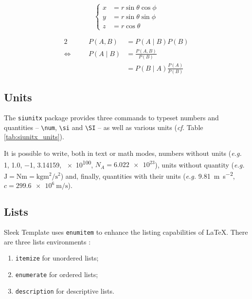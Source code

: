 \documentclass[a4paper, 12pt]{report}
\def\tbs{\textbackslash}
\begin{document}
    \begin{equation}
        \left\{
        \begin{aligned}
            x & = r \sin \theta \cos \phi \\
            y & = r \sin \theta \sin \phi \\
            z & = r \cos \theta
        \end{aligned}
        \right.
    \end{equation}

    \begin{alignat*}{2}
                              & & P(A, B)  & = P(A \mid B) P(B)                        \\
        \Leftrightarrow \quad & & P(A \mid B) & = \frac{P(A, B)}{P(B)}                 \\
                              & &          & = P(B \mid A) \frac{P(A)}{P(B)}
    \end{alignat*}

    \subsection{Units}

    The \texttt{siunitx} package provides three commands to typeset numbers and quantities -- \texttt{\tbs{}num}, \texttt{\tbs{}si} and \texttt{\tbs{}SI} -- as well as various units (\emph{cf.} Table \ref{tab:siunitx_units}).

    It is possible to write, both in text or math modes, numbers without units (\emph{e.g.} \num{1}, \num{1.0}, \num{-1}, \num{3.14159}, \num{e100}, $N_A = \num{6.022e23}$), units without quantity (\emph{e.g.} $\si{\joule} = \si{\newton\meter} = \si{\kilogram\meter\squared\per\second\squared}$) and, finally, quantities with their units (\emph{e.g.} \SI{9.81}{\meter\per\second\squared}, $c = \SI{299.6e6}{\meter\per\second}$).

    \subsection{Lists}

    Sleek Template uses \texttt{enumitem} to enhance the listing capabilities of \LaTeX{}. There are three lists environments :
    \begin{enumerate}
        \item \texttt{itemize} for unordered lists;
        \item \texttt{enumerate} for ordered lists;
        \item \texttt{description} for descriptive lists.
    \end{enumerate}
\end{document}
